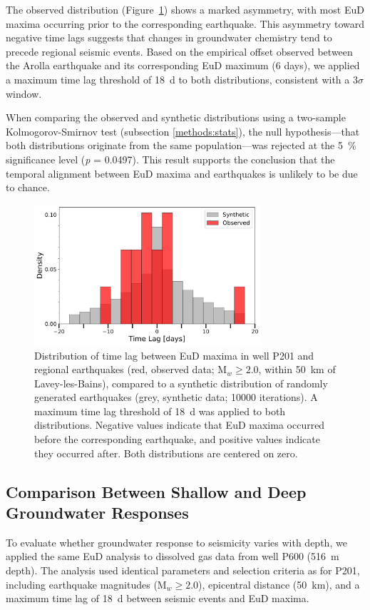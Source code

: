 The observed distribution (Figure~\ref{fig:distributions_P201}) shows a marked asymmetry, with most EuD maxima occurring prior to the corresponding earthquake.
This asymmetry toward negative time lags suggests that changes in groundwater chemistry tend to precede regional seismic events.
Based on the empirical offset observed between the Arolla earthquake and its corresponding EuD maximum (6 days), we applied a maximum time lag threshold of \SI{18}{\day} to both distributions, consistent with a 3$\sigma$ window.

When comparing the observed and synthetic distributions using a two-sample Kolmogorov-Smirnov test (subsection \ref{methods:stats}), the null hypothesis---that both distributions originate from the same population---was rejected at the \SI{5}{\percent} significance level (\textit{p} = 0.0497).
This result supports the conclusion that the temporal alignment between EuD maxima and earthquakes is unlikely to be due to chance.

\begin{figure}[H]
    \centering
    \includegraphics[width=0.75\textwidth]{chapters/04_chap3/figures/distribution_earthquakes_wo_outliers_well_201.pdf}
    \caption{Distribution of time lag between EuD maxima in well P201 and regional earthquakes (red, observed data; M$_w \geq 2.0$, within \SI{50}{\kilo\meter} of Lavey-les-Bains), compared to a synthetic distribution of randomly generated earthquakes (grey, synthetic data; \num{10000} iterations).
    A maximum time lag threshold of \SI{18}{\day} was applied to both distributions.
    Negative values indicate that EuD maxima occurred before the corresponding earthquake, and positive values indicate they occurred after.
    Both distributions are centered on zero.
    }
    \label{fig:distributions_P201}
\end{figure}

\subsection{Comparison Between Shallow and Deep Groundwater Responses}
To evaluate whether groundwater response to seismicity varies with depth, we applied the same EuD analysis to dissolved gas data from well P600 (\SI{516}{\metre} depth).
The analysis used identical parameters and selection criteria as for P201, including earthquake magnitudes (M$_w \geq 2.0$), epicentral distance (\SI{50}{\kilo\meter}), and a maximum time lag of \SI{18}{\day} between seismic events and EuD maxima.


